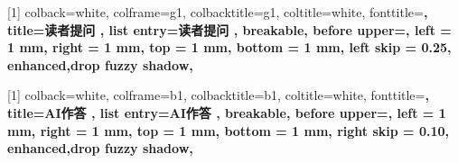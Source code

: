 \pagestyle{main}
\geometry{
  a4paper,
  left=3cm,
  right=3cm,
  top=2.54cm,
  bottom=2.54cm,
  headheight=1.5cm,
  headsep=10pt
}


\hypersetup{
    CJKbookmarks=true,
    colorlinks=true,
    breaklinks=true,
}


\graphicspath{ {assets/figures/} }


\theoremstyle{plain}
\newtheorem{theorem}{Theorem}[section]
\newtheorem{proposition}[theorem]{Proposition}
\newtheorem{lemma}[theorem]{Lemma}
\newtheorem{corollary}[theorem]{Corollary}
\theoremstyle{definition}
\newtheorem{definition}[theorem]{Definition}
\newtheorem{assumption}[theorem]{Assumption}
\theoremstyle{remark}
\newtheorem{remark}[theorem]{Remark}




[1]{
        colback=white, 
        colframe=g1, %
        colbacktitle=g1, 
        coltitle=white, %
        fonttitle=\bfseries, 
        title={读者提问 \thetcbcounter}, 
        list entry={读者提问 \thetcbcounter\quad}, %
        breakable, %
        before upper={\parindent10pt\noindent},  %
        left = 1 mm, %
        right = 1 mm, %
        top = 1 mm, %
        bottom = 1 mm,%
        left skip = 0.25\textwidth,
        enhanced,drop fuzzy shadow,  %
}

[1]{
        colback=white, 
        colframe=b1, %
        colbacktitle=b1, 
        coltitle=white, %
        fonttitle=\bfseries, 
        title={AI作答 \thetcbcounter}, 
        list entry={AI作答 \thetcbcounter\quad}, %
        breakable, %
        before upper={\parindent10pt\noindent},  %
        left = 1 mm, %
        right = 1 mm, %
        top = 1 mm, %
        bottom = 1 mm,%
        right skip = 0.10\textwidth,
        enhanced,drop fuzzy shadow,  %
}


